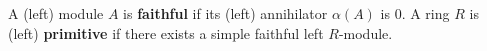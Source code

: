 A (left) module $A$ is \textbf{faithful} if its (left) annihilator $\alpha(A)$ is $0$. A ring $R$ is (left) \textbf{primitive} if there exists a simple faithful left $R$-module.
